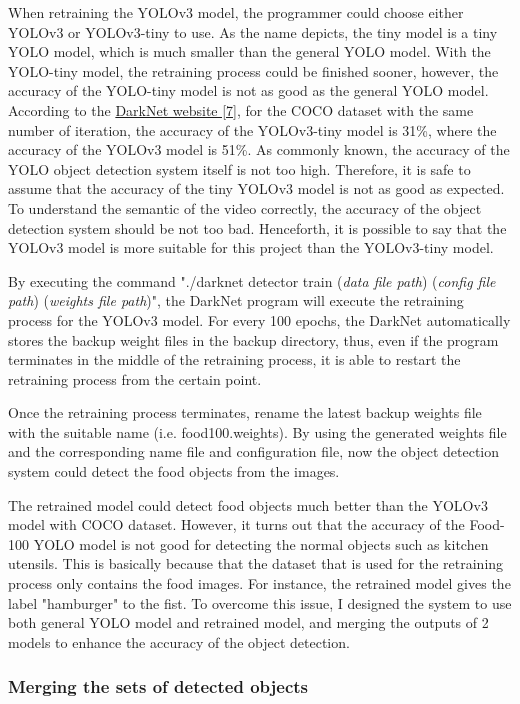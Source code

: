 \documentclass{article}
\begin{document}
When retraining the YOLOv3 model, the programmer could choose either YOLOv3 or YOLOv3-tiny to use. As the name depicts, the tiny model is a tiny YOLO model, which is much smaller than the general YOLO model. With the YOLO-tiny model, the retraining process could be finished sooner, however, the accuracy of the YOLO-tiny model is not as good as the general YOLO model. According to the \hyperlink{ref7}{DarkNet website [7]}, for the COCO dataset with the same number of iteration, the accuracy of the YOLOv3-tiny model is 31\%, where the accuracy of the YOLOv3 model is 51\%. As commonly known, the accuracy of the YOLO object detection system itself is not too high. Therefore, it is safe to assume that the accuracy of the tiny YOLOv3 model is not as good as expected. To understand the semantic of the video correctly, the accuracy of the object detection system should be not too bad. Henceforth, it is possible to say that the YOLOv3 model is more suitable for this project than the YOLOv3-tiny model.

By executing the command "./darknet detector train (\textit{data file path}) (\textit{config file path}) (\textit{weights file path})", the DarkNet program will execute the retraining process for the YOLOv3 model. For every 100 epochs, the DarkNet automatically stores the backup weight files in the backup directory, thus, even if the program terminates in the middle of the retraining process, it is able to restart the retraining process from the certain point.

Once the retraining process terminates, rename the latest backup weights file with the suitable name (i.e. food100.weights). By using the generated weights file and the corresponding name file and configuration file, now the object detection system could detect the food objects from the images.

The retrained model could detect food objects much better than the YOLOv3 model with COCO dataset. However, it turns out that the accuracy of the Food-100 YOLO model is not good for detecting the normal objects such as kitchen utensils. This is basically because that the dataset that is used for the retraining process only contains the food images. For instance, the retrained model gives the label "hamburger" to the fist. To overcome this issue, I designed the system to use both general YOLO model and retrained model, and merging the outputs of 2 models to enhance the accuracy of the object detection.

\subsubsection{Merging the sets of detected objects}
\end{document}
